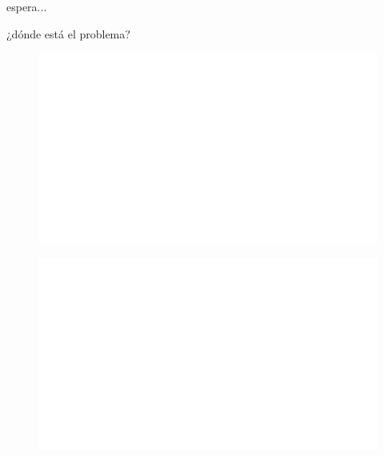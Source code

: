 \noindent
espera...

¿dónde está el problema?

\begin{centering}
    \begin{figure}[h]
        \centering
        \includegraphics[width=\textwidth]{whyareyoucheckingthenameofthisfile.png}
    \end{figure}
\end{centering}

\begin{centering}
    \begin{figure}[h!]
        \centering
        \includegraphics[width=\textwidth]{whyareyoucheckingthenameofthisfile.png}
    \end{figure}
\end{centering}

